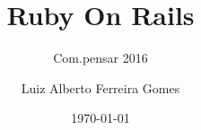 \author{Luiz Alberto Ferreira Gomes}
\title{Ruby On Rails}
\subtitle{Com.pensar 2016}
\date{\today}
